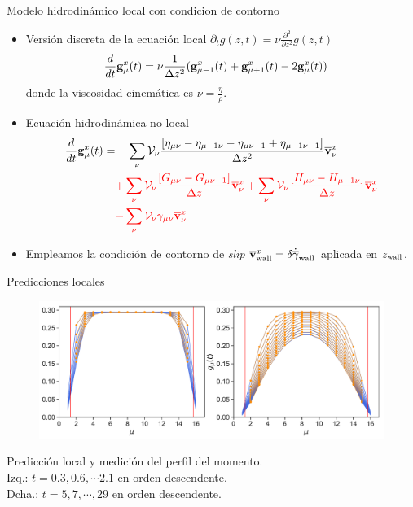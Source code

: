 \documentclass{beamer}
\begin{document}
\begin{frame}{Modelo hidrodinámico local con condicion de contorno}  
  \begin{itemize}
    \item<1-> Versión discreta de la ecuación local $\partial_t g(z,t)=\nu\frac{\partial^2}{\partial z^2} g(z,t)$
\begin{align}
  \frac{d}{dt}{\bf g}^x_\mu(t)&=\nu \frac{1}{\Delta z^2}({\bf g}^x_{\mu-1}(t)+{\bf g}^x_{\mu+1}(t)-2{\bf g}^x_{\mu}(t))
\nonumber
\end{align}
donde la viscosidad cinemática es $\nu=\frac{\eta}{\rho}$.
    \item<2-> Ecuación hidrodinámica no local 
\begin{align}
  \frac{d}{dt}{\bf g}^x_\mu(t)=&
-\sum_{\nu} {\cal V}_\nu \frac{\left[\eta_{\mu\nu}-\eta_{\mu-1\nu}-\eta_{\mu\nu-1}+\eta_{\mu-1\nu-1}\right]}{\Delta z^2}\overline{\bf v}^x_\nu \nonumber \\
  &{\color{red}+\sum_{\nu} {\cal V}_\nu\frac{\left[G_{\mu\nu}-G_{\mu\nu-1}\right]}{\Delta z}\overline{\bf v}^x_\nu
+\sum_{\nu} {\cal V}_\nu\frac{\left[H_{\mu\nu}-H_{\mu-1\nu}\right]}{\Delta z}
  \overline{\bf v}^x_\nu}
\nonumber \\
  &{\color{red}-\sum_{\nu} {\cal V}_\nu\gamma_{\mu\nu}\overline{\bf v}^x_\nu}
\nonumber
\end{align}
\item<3-> Empleamos la condición de contorno de \textit{slip} $\overline{\bf v}_{\rm wall}^x=\delta \dot{\overline{\gamma}}_{\rm wall}$ aplicada en $z_{\rm wall}$.
  \end{itemize}
\end{frame}



\begin{frame}{Predicciones locales}
\begin{figure}[]
\includegraphics[width=\linewidth]{gxtLocalPrediction-17nodes-WALLS-defense}
\end{figure}
  {\color{orange} Predicción local}
  y {\color{blue} medición} del perfil del momento.\\
  Izq.: $t=0.3,0.6,\cdots2.1$ en orden descendente.\\
  Dcha.: $t=5,7,\cdots,29$  en orden descendente.
\end{frame}
\end{document}
